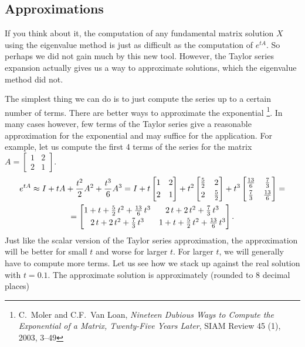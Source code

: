 \documentclass{ximera}
\begin{document}
\subsection{Approximations}

If you think about it, the computation of any fundamental matrix solution $X$ using the eigenvalue method is just as difficult as the computation of $e^{tA}$. So perhaps we did not gain much by this new tool.  However, the Taylor series expansion actually gives us a way to approximate solutions, which the eigenvalue method did not.

The simplest thing we can do is to just compute the series up to a certain number of terms.  There 
are better ways to approximate the exponential%
\footnote{C.\ Moler and C.F.\ Van Loan, \emph{Nineteen Dubious Ways to Compute the Exponential of a Matrix, Twenty-Five Years Later}, SIAM Review 45 (1), 2003, 3--49}.
In many cases however, few terms of the Taylor series give a reasonable approximation for the exponential and may suffice for the application.  For example, let us compute the first 4 terms of the series for the matrix 
$A = 
\left[ 
    \begin{smallmatrix}
        1 & 2 \\
        2 & 1
    \end{smallmatrix} 
\right]$.
\begin{multline*}
    e^{tA} \approx I + tA + \frac{t^2}{2}A^2 + \frac{t^3}{6}A^3 = I + t
    \begin{bmatrix}
        1 & 2 \\
        \noalign{\smallskip}
        2 & 1
    \end{bmatrix}
    + t^2
    \begin{bmatrix}
        \frac{5}{2} & 2 \\
        \noalign{\smallskip}
        2 & \frac{5}{2}
    \end{bmatrix}
    + t^3
    \begin{bmatrix}
        \frac{13}{6} & \frac{7}{3} \\
        \noalign{\smallskip}
        \frac{7}{3} & \frac{13}{6}
    \end{bmatrix}
    = \\
    =
    \begin{bmatrix}
        1 + t + \frac{5}{2}\, t^2 + \frac{13}{6}\, t^3 & 2\,t + 2\, t^2   + \frac{7}{3}\, t^3 \\
        \noalign{\smallskip} 2\,t + 2\, t^2   + \frac{7}{3}\, t^3 & 1 + t + \frac{5}{2}\, t^2 + \frac{13}{6}\, t^3
    \end{bmatrix} .
\end{multline*}
Just like the scalar version of the Taylor series approximation, the approximation will be better for small $t$ and worse for larger $t$.  For larger $t$, we will generally have to compute more terms. Let us see how we stack up against the real solution with $t=0.1$.  The approximate solution is approximately (rounded to 8 decimal places)
\end{document}
